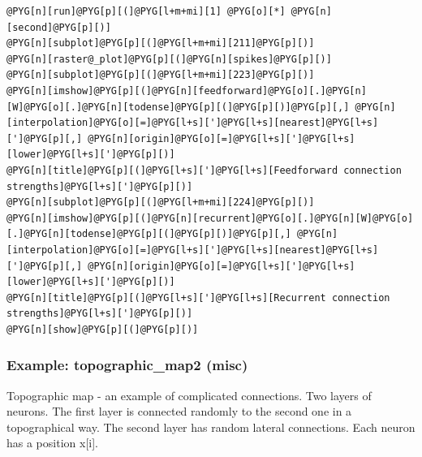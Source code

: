 \documentclass[letterpaper,10pt,english]{manual}
\begin{document}
\begin{Verbatim}[commandchars=@\[\]]
@PYG[n][run]@PYG[p][(]@PYG[l+m+mi][1] @PYG[o][*] @PYG[n][second]@PYG[p][)]
@PYG[n][subplot]@PYG[p][(]@PYG[l+m+mi][211]@PYG[p][)]
@PYG[n][raster@_plot]@PYG[p][(]@PYG[n][spikes]@PYG[p][)]
@PYG[n][subplot]@PYG[p][(]@PYG[l+m+mi][223]@PYG[p][)]
@PYG[n][imshow]@PYG[p][(]@PYG[n][feedforward]@PYG[o][.]@PYG[n][W]@PYG[o][.]@PYG[n][todense]@PYG[p][(]@PYG[p][)]@PYG[p][,] @PYG[n][interpolation]@PYG[o][=]@PYG[l+s][']@PYG[l+s][nearest]@PYG[l+s][']@PYG[p][,] @PYG[n][origin]@PYG[o][=]@PYG[l+s][']@PYG[l+s][lower]@PYG[l+s][']@PYG[p][)]
@PYG[n][title]@PYG[p][(]@PYG[l+s][']@PYG[l+s][Feedforward connection strengths]@PYG[l+s][']@PYG[p][)]
@PYG[n][subplot]@PYG[p][(]@PYG[l+m+mi][224]@PYG[p][)]
@PYG[n][imshow]@PYG[p][(]@PYG[n][recurrent]@PYG[o][.]@PYG[n][W]@PYG[o][.]@PYG[n][todense]@PYG[p][(]@PYG[p][)]@PYG[p][,] @PYG[n][interpolation]@PYG[o][=]@PYG[l+s][']@PYG[l+s][nearest]@PYG[l+s][']@PYG[p][,] @PYG[n][origin]@PYG[o][=]@PYG[l+s][']@PYG[l+s][lower]@PYG[l+s][']@PYG[p][)]
@PYG[n][title]@PYG[p][(]@PYG[l+s][']@PYG[l+s][Recurrent connection strengths]@PYG[l+s][']@PYG[p][)]
@PYG[n][show]@PYG[p][(]@PYG[p][)]
\end{Verbatim}

\resetcurrentobjects
\hypertarget{--doc-examples-misc_topographic_map2}{}

\hypertarget{index-70}{}\subsubsection{Example: topographic\_map2 (misc)}

Topographic map - an example of complicated connections.
Two layers of neurons.
The first layer is connected randomly to the second one in a
topographical way.
The second layer has random lateral connections.
Each neuron has a position x{[}i{]}.
\end{document}

